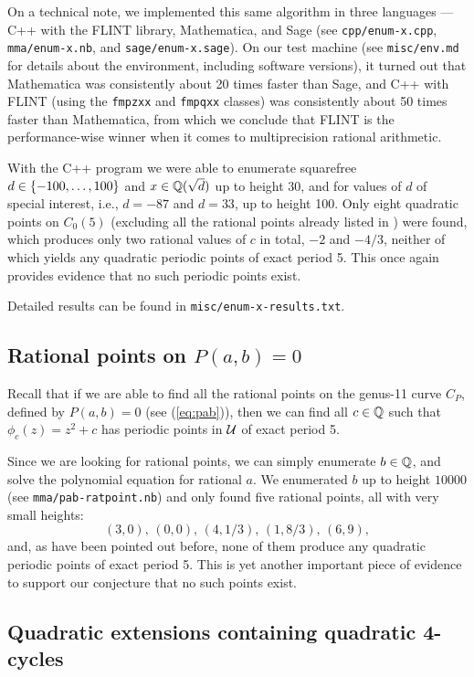 On a technical note, we implemented this same algorithm in three
languages --- C++ with the FLINT library, Mathematica, and Sage (see
\texttt{cpp/enum-x.cpp}, \texttt{mma/enum-x.nb}, and
\texttt{sage/enum-x.sage}). On our test machine (see
\texttt{misc/env.md} for details about the environment, including
software versions), it turned out that Mathematica was consistently
about 20 times faster than Sage, and C++ with FLINT (using the
\texttt{fmpzxx} and \texttt{fmpqxx} classes) was consistently about 50
times faster than Mathematica, from which we conclude that FLINT is
the performance-wise winner when it comes to multiprecision rational
arithmetic.

With the C++ program we were able to enumerate squarefree $d \in
\left\{-100, \dots, 100\right\}$ and $x \in \mathbb{Q}(\sqrt{d})$ up to height 30, and
for values of $d$ of special interest, i.e., $d = -87$ and $d = 33$,
up to height 100. Only eight quadratic points on $C_0(5)$ (excluding
all the rational points already listed in \cite{MR1480542}) were
found, which produces only two rational values of $c$ in total, $-2$
and $-4/3$, neither of which yields any quadratic periodic points of
exact period 5. This once again provides evidence that no such
periodic points exist.

Detailed results can be found in \texttt{misc/enum-x-results.txt}.

\subsection{Rational points on $P(a, b) = 0$}
\label{subsec:pab-ratpoint}

Recall that if we are able to find all the rational points on the
genus-11 curve $C_P$, defined by $P(a, b) = 0$ (see (\ref{eq:pab})),
then we can find all $c \in \mathbb{Q}$ such that $\phi_c(z) = z^2 + c$ has
periodic points in $\mathcal{U}$ of exact period 5.

Since we are looking for rational points, we can simply enumerate $b
\in \mathbb{Q}$, and solve the polynomial equation for rational $a$. We
enumerated $b$ up to height $10000$ (see \texttt{mma/pab-ratpoint.nb})
and only found five rational points, all with very small heights:
\[
(3, 0),\, (0, 0),\, (4, 1/3),\, (1, 8/3),\, (6, 9),
\]
and, as have been pointed out before, none of them produce any
quadratic periodic points of exact period 5. This is yet another
important piece of evidence to support our conjecture that no such
points exist.

\subsection{Quadratic extensions containing quadratic 4-cycles}
\label{subsec:d-distribution}

